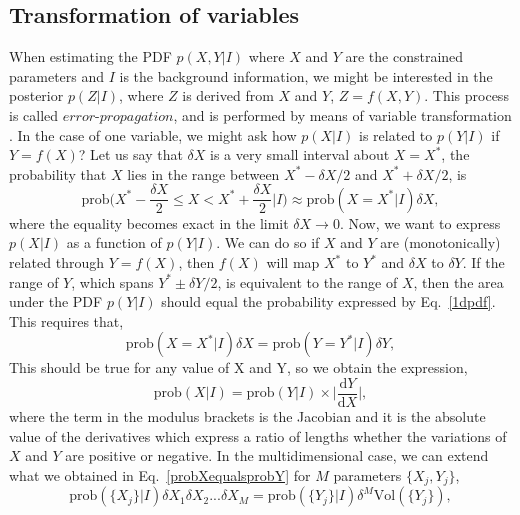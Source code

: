 \documentclass[a4paper,12pt]{article}
\begin{document}
\subsection{Transformation of variables}
\label{subsec:transfvariables}

When estimating the PDF $p(X,Y|I)$ where $X$ and $Y$ are the constrained parameters and $I$ is the background information, we might be interested in the posterior $p(Z|I)$, where $Z$ is derived from $X$ and $Y$, $Z=f(X,Y)$. This process is called $\textit{error-propagation}$, and is performed by means of variable transformation \cite{sivia2006data}. In the case of one variable, we might ask how $p(X|I)$ is related to $p(Y|I)$ if $Y=f(X)$? Let us say that $\delta X$ is a very small interval about $X=X^{\ast}$, the probability that $X$ lies in the range between $X^{\ast}-\delta X/2$ and $X^{\ast} + \delta X/2$, is
\begin{equation}
\text{prob}\bigg(X^{\ast} - \frac{\delta X}{2} \leq X < X^{\ast} + \frac{\delta X}{2}|I\bigg) \approx \text{prob}(X = X^{\ast} |I)\delta X,
\label{1dpdf}
\end{equation}
where the equality becomes exact in the limit $\delta X \rightarrow 0$.
Now, we want to express $p(X|I)$ as a function of $p(Y|I)$. We can do so if $X$ and $Y$ are (monotonically) related through $Y=f(X)$, then $f(X)$ will map $X^{\ast}$ to $Y^{\ast}$ and $\delta X$ to $\delta Y$. If the range of $Y$, which spans $Y^{\ast} \pm \delta Y/2$, is equivalent to the range of $X$, then the area under the PDF $p(Y|I)$ should equal the probability expressed by Eq.~\eqref{1dpdf}. This requires that,
\begin{equation}
\text{prob}(X = X^{\ast} |I)\delta X = \text{prob}(Y = Y^{\ast} |I)\delta Y,
\label{probXequalsprobY}
\end{equation}
This should be true for any value of X and Y, so we obtain the expression,
\begin{equation}
\text{prob}(X|I)= \text{prob}(Y|I) \times \bigg| \frac{\text{d} Y}{\text{d} X} \bigg|,
\label{jacobian}
\end{equation}
where the term in the modulus brackets is the Jacobian and it is the absolute value of the derivatives which express a ratio of lengths whether the variations of $X$ and $Y$ are positive or negative. 
In the multidimensional case, we can extend what we obtained in Eq.~\eqref{probXequalsprobY} for $M$ parameters $\{X_{j},Y_{j}\}$,
\begin{equation}
\text{prob}(\{X_{j}\}|I)\delta X_{1} \delta X_{2}...\delta X_{M} = \text{prob}(\{Y_{j}\}|I) \delta^{M} \text{Vol}(\{Y_{j}\}),
\label{multijacobian}
\end{equation}
\end{document}
